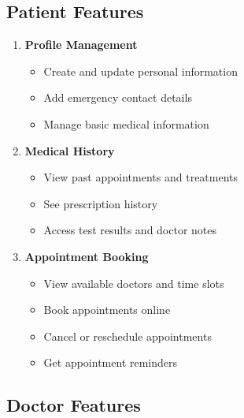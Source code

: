 \documentclass[12pt,a4paper]{article}
\begin{document}
\subsection{Patient Features}
\begin{enumerate}
    \item 
        \textbf{Profile Management}
        \begin{itemize}[itemsep=0.1cm]
            \item Create and update personal information
            \item Add emergency contact details
            \item Manage basic medical information
        \end{itemize}

    \item 
        \textbf{Medical History}
        \begin{itemize}[itemsep=0.1cm]
            \item View past appointments and treatments
            \item See prescription history
            \item Access test results and doctor notes
        \end{itemize}
    \item 
        \textbf{Appointment Booking}
        \begin{itemize}[itemsep=0.1cm]
            \item View available doctors and time slots
            \item Book appointments online
            \item Cancel or reschedule appointments
            \item Get appointment reminders
        \end{itemize}
        
\end{enumerate}





\subsection{Doctor Features}
\end{document}
